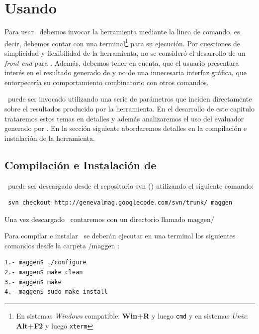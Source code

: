 \chapter{Usando \maggen}
\label{chap:usos}
\minitoc

Para usar \maggen\ debemos invocar la herramienta mediante la linea de comando, es decir, debemos contar con una terminal\footnote{En sistemas \textit{Windows} compatible: \textbf{Win+R} y luego \texttt{cmd} y en sistemas \textit{Unix}: \textbf{Alt+F2} y luego \texttt{xterm}} para su ejecución. Por cuestiones de simplicidad y flexibilidad de la herramienta, no se consideró el desarrollo de un \textit{front-end} para \maggen. Además, debemos tener en cuenta, que el usuario presentara interés en el resultado generado de \maggen y no de una innecesaria interfaz gráfica, que entorpecería su comportamiento combinatorio con otros comandos.
  
\maggen\ puede ser invocado utilizando una serie de parámetros que inciden directamente sobre el resultados producido por la herramienta. En el desarrollo de este capitulo trataremos estos temas en detalles y además analizaremos el uso del evaluador generado por \maggen. En la sección siguiente abordaremos detalles en la compilación e instalación de la herramienta.

\section{Compilación e Instalación de \maggen}
\maggen\ puede ser descargado desde el repositorio svn (\cite{svn}) utilizando el siguiente comando:
\begin{verbatim}
 svn checkout http://genevalmag.googlecode.com/svn/trunk/ maggen
\end{verbatim}

Una vez descargado \maggen\ contaremos con un directorio llamado {\sf maggen/}

Para compilar e instalar \maggen\ se deberán ejecutar en una terminal los siguientes comandos desde la carpeta {\sf /maggen} :
\begin{verbatim}
1.- maggen$ ./configure
2.- maggen$ make clean
3.- maggen$ make
4.- maggen$ sudo make install
\end{verbatim}

